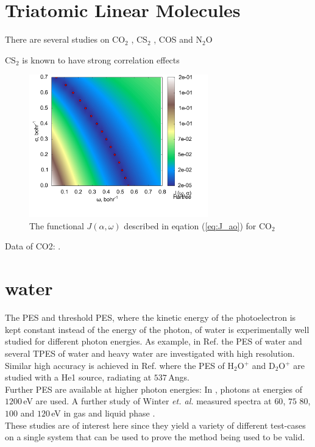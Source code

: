 \section{Triatomic Linear Molecules}
There are several studies on CO$_2$ \cite{CO2, CO2_highres, HighResLinear, DiffLinear}, CS$_2$ \cite{DiffLinear,HighResLinear}, COS \cite{DiffLinear,HighResLinear} and N$_2$O \cite{DiffLinear}

CS$_2$ is known to have strong correlation effects \cite{2phcederbaum}
\begin{figure}
\includegraphics[width=0.69\textwidth]{Figures/CO2_J0_2D_terrain}
\caption{The functional $J(\alpha,\omega)$ described in eqation (\ref{eq:J_ao}) for CO$_2$}
\label{fig:CO2-otrsh}
\end{figure}

Data of CO2: \cite{DiffLinear}.

\section{water}
The PES and threshold PES, where the kinetic energy of the photoelectron is kept constant instead of the energy of the photon, of water is experimentally well studied 
for different photon energies.
As example, in Ref. \cite{waterTPE} the PES of water and several TPES of water and heavy water are investigated with high resolution.\\
Similar high accuracy is achieved in Ref. \cite{waterHePES} where the PES of H$_2$O$^+$ and D$_2$O$^+$ are studied with a He1 source, radiating at $537\,$Angs.\\
Further PES are available at higher photon energies:
In \cite{water1200}, photons at energies of $1200\,$eV are used.
A further study of Winter \textit{et. al.} measured spectra at $60$, $75$ $80$, $100$ and $120\,$eV in gas and liquid phase \cite{winterWater}.\\
These studies are of interest here since they yield a variety of different test-cases on a single system that can be used to prove the method being used to be valid.
